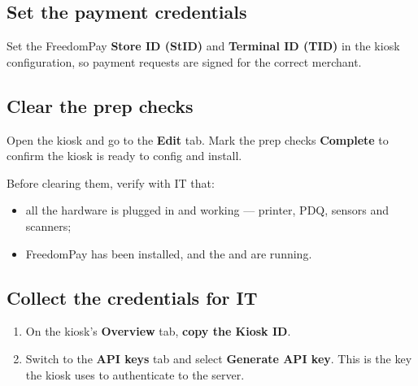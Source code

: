 \documentclass[a4paper,10pt]{article}
\begin{document}

\subsection{Set the payment credentials}

Set the FreedomPay \textbf{Store ID (StID)} and \textbf{Terminal ID
(TID)} in the kiosk configuration, so payment requests are signed for the
correct merchant.

\subsection{Clear the prep checks}

Open the kiosk and go to the \textbf{Edit} tab. Mark the prep checks
\textbf{Complete} to confirm the kiosk is ready to config and install.


Before clearing them, verify with IT that:

\begin{itemize}
  \item all the hardware is plugged in and working --- printer, PDQ,
        sensors and scanners;
  \item FreedomPay has been installed, and the
         and  are
        running.
\end{itemize}

\subsection{Collect the credentials for IT}

\begin{enumerate}
  \item On the kiosk's \textbf{Overview} tab, \textbf{copy the Kiosk ID}.
\end{enumerate}


\begin{enumerate}\setcounter{enumi}{1}
  \item Switch to the \textbf{API keys} tab and select \textbf{Generate
        API key}. This is the key the kiosk uses to authenticate to the
        server.
\end{enumerate}
\end{document}
